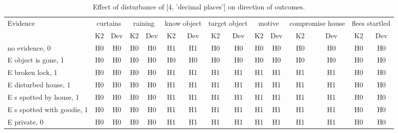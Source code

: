 \begin{table}\begin{tabular}{l|cc|cc|cc|cc|cc|cc|cc}\toprule\multirow{2}{*}{Evidence} & \multicolumn{2}{c}{curtains}& \multicolumn{2}{c}{raining}& \multicolumn{2}{c}{know object}& \multicolumn{2}{c}{target object}& \multicolumn{2}{c}{motive}& \multicolumn{2}{c}{compromise house}& \multicolumn{2}{c}{flees startled}\\& {K2} & {Dev}& {K2} & {Dev}& {K2} & {Dev}& {K2} & {Dev}& {K2} & {Dev}& {K2} & {Dev}& {K2} & {Dev}\\\midrule
no evidence, 0 & H0&H0&H0&H0&H1&H1&H0&H0&H0&H0&H0&H0&H0&H0\\E object is gone, 1 & H0&H0&H0&H0&H0&H0&H0&H0&H0&H0&H0&H0&H0&H0\\E broken lock, 1 & H0&H0&H0&H0&H1&H1&H1&H1&H1&H1&H1&H1&H0&H0\\E disturbed house, 1 & H0&H0&H0&H0&H1&H1&H1&H1&H1&H1&H1&H1&H0&H0\\E s spotted by house, 1 & H0&H0&H0&H0&H1&H1&H1&H1&H1&H1&H1&H1&H0&H0\\E s spotted with goodie, 1 & H0&H0&H0&H0&H1&H1&H1&H1&H1&H1&H1&H1&H0&H0\\E private, 0 & H0&H0&H0&H0&H1&H1&H1&H1&H1&H1&H1&H1&H0&H0\\\bottomrule\end{tabular}\caption{Effect of disturbance of [4, 'decimal places'] on direction of outcomes.}\end{table}